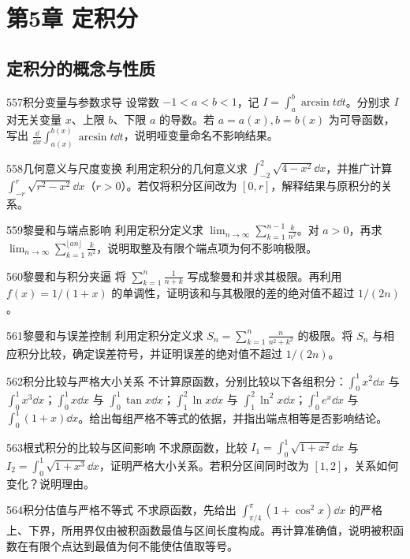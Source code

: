 \section{第5章 定积分}
\subsection{定积分的概念与性质}
\begin{exercise}{557}{积分变量与参数求导}
设常数 $-1<a<b<1$，记 $I=\int_a^b\arcsin t\dd t$。分别求 $I$ 对无关变量 $x$、上限 $b$、下限 $a$ 的导数。若 $a=a(x),b=b(x)$ 为可导函数，写出 $\frac\dd{\dd x}\int_{a(x)}^{b(x)}\arcsin t\dd t$，说明哑变量命名不影响结果。
\end{exercise}
\begin{exercise}{558}{几何意义与尺度变换}
利用定积分的几何意义求 $\int_{-2}^{2}\sqrt{4-x^2}\dd x$，并推广计算 $\int_{-r}^{r}\sqrt{r^2-x^2}\dd x$（$r>0$）。若仅将积分区间改为 $[0,r]$，解释结果与原积分的关系。
\end{exercise}
\begin{exercise}{559}{黎曼和与端点影响}
利用定积分定义求 $\lim_{n\to\infty}\sum_{k=1}^{n-1}\frac{k}{n^2}$。对 $a>0$，再求 $\lim_{n\to\infty}\sum_{k=1}^{\lfloor an\rfloor}\frac{k}{n^2}$，说明取整及有限个端点项为何不影响极限。
\end{exercise}
\begin{exercise}{560}{黎曼和与积分夹逼}
将 $\sum_{k=1}^n\frac1{n+k}$ 写成黎曼和并求其极限。再利用 $f(x)=1/(1+x)$ 的单调性，证明该和与其极限的差的绝对值不超过 $1/(2n)$。
\end{exercise}
\begin{exercise}{561}{黎曼和与误差控制}
利用定积分定义求 $S_n=\sum_{k=1}^n\frac{n}{n^2+k^2}$ 的极限。将 $S_n$ 与相应积分比较，确定误差符号，并证明误差的绝对值不超过 $1/(2n)$。
\end{exercise}
\begin{exercise}{562}{积分比较与严格大小关系}
不计算原函数，分别比较以下各组积分：$\int_0^1x^2\dd x$ 与 $\int_0^1x^3\dd x$；$\int_0^1x\dd x$ 与 $\int_0^1\tan x\dd x$；$\int_1^2\ln x\dd x$ 与 $\int_1^2\ln^2x\dd x$；$\int_0^1e^x\dd x$ 与 $\int_0^1(1+x)\dd x$。给出每组严格不等式的依据，并指出端点相等是否影响结论。
\end{exercise}
\begin{exercise}{563}{根式积分的比较与区间影响}
不求原函数，比较 $I_1=\int_0^1\sqrt{1+x^2}\dd x$ 与 $I_2=\int_0^1\sqrt{1+x^3}\dd x$，证明严格大小关系。若积分区间同时改为 $[1,2]$，关系如何变化？说明理由。
\end{exercise}
\begin{exercise}{564}{积分估值与严格不等式}
不求原函数，先给出 $\int_{\pi/4}^{\pi}(1+\cos^2x)\dd x$ 的严格上、下界，所用界仅由被积函数最值与区间长度构成。再计算准确值，说明被积函数在有限个点达到最值为何不能使估值取等号。
\end{exercise}
